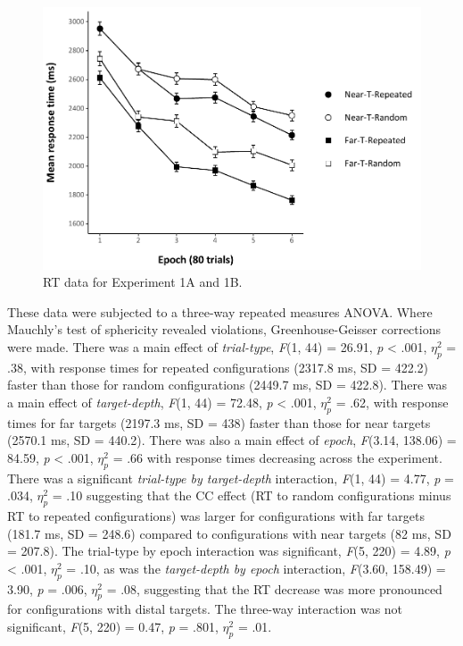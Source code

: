 \documentclass[
  english,
  man,floatsintext]{apa7}
\begin{document}
\begin{figure}

{\centering \includegraphics[width=1\linewidth]{CCVR_manuscript_files/figure-latex/Exp1-RT-figure-1} 

}

\caption{RT data for Experiment 1A and 1B.}\label{fig:Exp1-RT-figure}
\end{figure}

These data were subjected to a three-way repeated measures ANOVA. Where Mauchly's test of sphericity revealed violations, Greenhouse-Geisser corrections were made. There was a main effect of \emph{trial-type}, \emph{F}(1, 44) = 26.91, \emph{p} \textless{} .001, \(\eta^2_p\) = .38, with response times for repeated configurations (2317.8 ms, SD = 422.2) faster than those for random configurations (2449.7 ms, SD = 422.8). There was a main effect of \emph{target-depth}, \emph{F}(1, 44) = 72.48, \emph{p} \textless{} .001, \(\eta^2_p\) = .62, with response times for far targets (2197.3 ms, SD = 438) faster than those for near targets (2570.1 ms, SD = 440.2). There was also a main effect of \emph{epoch}, \emph{F}(3.14, 138.06) = 84.59, \emph{p} \textless{} .001, \(\eta^2_p\) = .66 with response times decreasing across the experiment. There was a significant \emph{trial-type by target-depth} interaction, \emph{F}(1, 44) = 4.77, \emph{p} = .034, \(\eta^2_p\) = .10 suggesting that the CC effect (RT to random configurations minus RT to repeated configurations) was larger for configurations with far targets (181.7 ms, SD = 248.6) compared to configurations with near targets (82 ms, SD = 207.8). The trial-type by epoch interaction was significant, \emph{F}(5, 220) = 4.89, \emph{p} \textless{} .001, \(\eta^2_p\) = .10, as was the \emph{target-depth by epoch} interaction, \emph{F}(3.60, 158.49) = 3.90, \emph{p} = .006, \(\eta^2_p\) = .08, suggesting that the RT decrease was more pronounced for configurations with distal targets. The three-way interaction was not significant, \emph{F}(5, 220) = 0.47, \emph{p} = .801, \(\eta^2_p\) = .01.
\end{document}
